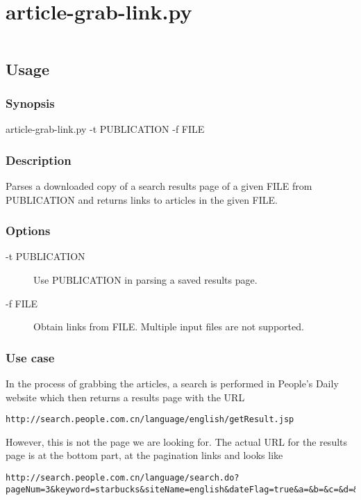 \appendix
\chapter{article-grab-link.py}\label{appdx:grab-link}

\inputminted[linenos]{python}{data/script/article-grab-link.py}

\section{Usage}

\subsection{Synopsis}

article-grab-link.py -t PUBLICATION -f FILE

\subsection{Description}

Parses a downloaded copy of a search results page of a given FILE from
PUBLICATION and returns links to articles in the given FILE.

\subsection{Options}

\begin{description}
	\item [-t PUBLICATION] Use PUBLICATION in parsing a saved results page.
	\item [-f FILE] Obtain links from FILE. Multiple input files are not
	supported.
\end{description}

\subsection{Use case}

In the process of grabbing the articles, a search is performed in People's Daily
website which then returns a results page with the URL
\begin{verbatim}
http://search.people.com.cn/language/english/getResult.jsp
\end{verbatim}
However, this is not the page we are looking for. The actual URL for the results
page is at the bottom part, at the pagination links and looks like
\begin{verbatim}
http://search.people.com.cn/language/search.do?pageNum=3&keyword=starbucks&siteName=english&dateFlag=true&a=&b=&c=&d=&e=&f=
\end{verbatim}

